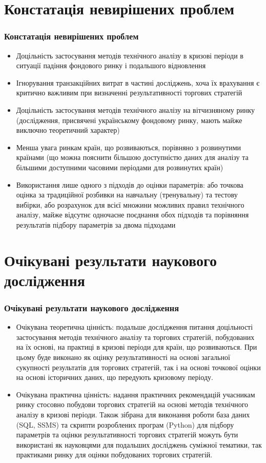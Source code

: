 \documentclass[aspectratio=169]{beamer}
\begin{document}
\section{Констатація невирішених проблем}
\begin{frame}
\frametitle{Констатація невирішених проблем}
\begin{itemize}
\item Доцільність застосування методів технічного аналізу в \alert {кризові періоди в ситуації падіння фондового ринку і подальшого відновлення}
\tinyskip
\item \alert {Ігнорування транзакційних витрат} в частині досліджень, хоча їх врахування є критично важливим при визначенні результативності торгових стратегій
\tinyskip
\item Доцільність \alert {застосування методів технічного аналізу на вітчизняному ринку} (дослідження, присвячені українському фондовому ринку, мають майже виключно теоретичний характер)
\tinyskip
\item Менша увага \alert {ринкам країн, що розвиваються}, порівняно з розвинутими країнами (що можна пояснити більшою доступністю даних для аналізу та більшими доступними часовими періодами для розвинутих країн)
\tinyskip
\item Використання \alert {лише одного з підходів до оцінки параметрів}: або точкова оцінка за традиційної розбивки на навчальну (тренувальну) та тестову вибірки, або розрахунок для всієї множини можливих правил технічного аналізу, майже відсутнє одночасне поєднання обох підходів та порівняння результатів підбору параметрів за двома підходами
\end{itemize}
\end{frame}

\section{Очікувані результати наукового дослідження}
\begin{frame}
\frametitle{Очікувані результати наукового дослідження}
\begin{itemize}
\item \alert {Очікувана теоретична цінність}: подальше дослідження питання доцільності застосування методів технічного аналізу та торгових стратегій, побудованих на їх основі, на практиці в кризові періоди для країн, що розвиваються. При цьому буде виконано як оцінку результативності на основі загальної сукупності результатів для торгових стратегій, так і на основі точкової оцінки на основі історичних даних, що передують кризовому періоду.
\bigskip
\item \alert {Очікувана практична цінність}: надання практичних рекомендацій учасникам ринку стосовно побудови торгових стратегій на основі методів технічного аналізу в кризові періоди. Також зібрана для виконання роботи база даних (SQL, SSMS) та скрипти розроблених програм (Python) для підбору параметрів та оцінки результативності торгових стратегій можуть бути використані як науковцями для подальших досліджень суміжної тематики, так практиками ринку для оцінки побудованих торгових стратегій.
\end{itemize}
\end{frame}
\end{document}
